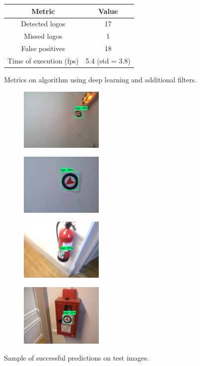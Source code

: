 \documentclass[12pt]{article}%
\begin{document}
\begin{figure}
    \centering
        \begin{tabular}{c | c}
        Metric                  & Value \\
        \hline
        Detected logos          & 17 \\
        Missed logos            & 1 \\
        False positives         & 18 \\
        Time of execution (fps) & 5.4 (std = 3.8) \\
        \end{tabular}
    \caption{Metrics on algorithm using deep learning and additional filters.}
    \label{fig:correctedDeepLearningResults}
\end{figure}


\captionsetup[subfigure]{labelformat=simple, labelsep=period}
\begin{figure}
	\centering
	\begin{subfigure}[t]{4cm}
		\centering
		\includegraphics[width=4cm]{images/detection1.PNG}
	\end{subfigure}
	\begin{subfigure}[t]{4cm}
		\centering
		\includegraphics[width=4cm]{images/detection2.PNG}
	\end{subfigure}
	\begin{subfigure}[t]{4cm}
		\centering
		\includegraphics[width=4cm]{images/detection3.PNG}
	\end{subfigure}
	\begin{subfigure}[t]{4cm}
		\centering
		\includegraphics[width=4cm]{images/detection4.PNG}
	\end{subfigure}
	\caption{Sample of successful predictions on test images.}\label{fig:finalPredictionResults}
\end{figure}
\end{document}
